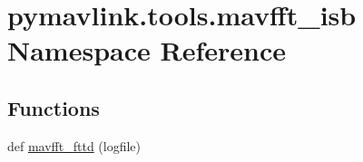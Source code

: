 \hypertarget{namespacepymavlink_1_1tools_1_1mavfft__isb}{}\section{pymavlink.\+tools.\+mavfft\+\_\+isb Namespace Reference}
\label{namespacepymavlink_1_1tools_1_1mavfft__isb}
\subsection*{Functions}
\begin{DoxyCompactItemize}
\item 
def \mbox{\hyperlink{namespacepymavlink_1_1tools_1_1mavfft__isb_afccb65d686e62d19b1fe4564c29052f5}{mavfft\+\_\+fttd}} (logfile)
\end{DoxyCompactItemize}
